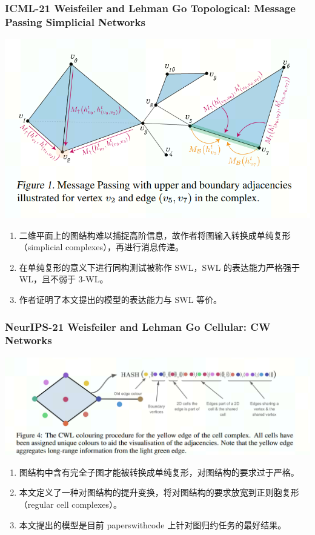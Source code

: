 \documentclass{beamer}
\begin{document}
\begin{frame}

  \frametitle{ICML-21 Weisfeiler and Lehman Go Topological: Message Passing Simplicial Networks}
  \begin{center}
    \includegraphics[scale=0.5]{figs/SWL.png}    
  \end{center}
  \begin{enumerate}
    \item 二维平面上的图结构难以捕捉高阶信息，故作者将图输入转换成单纯复形（simplicial complexes），再进行消息传递。
    \item 在单纯复形的意义下进行同构测试被称作 SWL，SWL 的表达能力严格强于 WL，且不弱于 3-WL。
    \item 作者证明了本文提出的模型的表达能力与 SWL 等价。
  \end{enumerate}

\end{frame}

\begin{frame}

  \frametitle{NeurIPS-21 Weisfeiler and Lehman Go Cellular: CW Networks}
  \begin{center}
    \includegraphics[scale=0.6]{figs/CWL.png}    
  \end{center}
  \begin{enumerate}
    \item 图结构中含有完全子图才能被转换成单纯复形，对图结构的要求过于严格。
    \item 本文定义了一种对图结构的提升变换，将对图结构的要求放宽到正则胞复形（regular cell complexes）。
    \item 本文提出的模型是目前 paperswithcode 上针对图归约任务的最好结果。
  \end{enumerate}

\end{frame}
\end{document}
